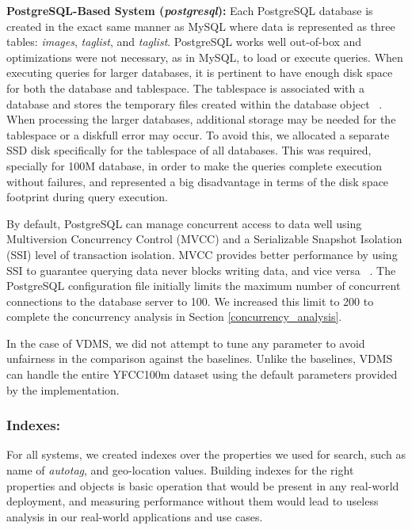 \textbf{PostgreSQL-Based System (\textit{postgresql}):}
Each PostgreSQL database is created in the exact same manner as MySQL
where data is represented as three tables:
\textit{images}, \textit{taglist}, and \textit{taglist}.
PostgreSQL works well out-of-box and optimizations were not necessary,
as in MySQL, to load or execute queries.
When executing queries for larger databases,
it is pertinent to have enough disk space for both
the database and tablespace.
The tablespace is associated with a database and stores the temporary files
created within the database object ~\cite{postgresql}.
When processing the larger databases, additional
storage may be needed for the tablespace or a diskfull error may occur.
To avoid this, we allocated a separate SSD disk specifically
for the tablespace of all databases.
This was required, specially for 100M database, in order to make the queries
complete execution without failures, and represented a big disadvantage
in terms of the disk space footprint during query execution.

By default, PostgreSQL can manage concurrent access to data well using
Multiversion Concurrency Control (MVCC) and a Serializable Snapshot Isolation
(SSI) level of transaction isolation.
MVCC provides better performance by using SSI to guarantee querying data never
blocks writing data, and vice versa ~\cite{postgresql}.
The PostgreSQL configuration file initially limits the maximum
number of concurrent connections to the database server to 100.
We increased this limit to 200 to complete the concurrency analysis
in Section \ref{concurrency_analysis}.

In the case of VDMS, we did not attempt to tune any
parameter to avoid unfairness in the comparison against the baselines.
Unlike the baselines, VDMS can handle the entire YFCC100m dataset
using the default parameters provided by the implementation.

\subsubsection{Indexes:}
For all systems, we created indexes over the
properties we used for search, such as name of
\textit{autotag}, and geo-location values.
Building indexes for the right properties and objects
is basic operation that would be present in any real-world deployment,
and measuring performance without them would lead to useless analysis in our
real-world applications and use cases.

